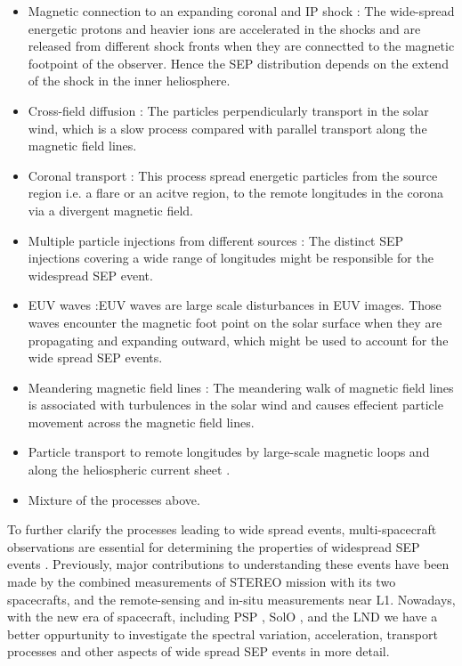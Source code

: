 \begin{itemize}
	\item Magnetic connection to an expanding coronal and IP shock \citep{Cliver1995ICRC, Torsti1999JGR, Reames1999, cane2003two, Richardson2014SoPh, Kouloumvakos2019ApJ}: 
	The wide-spread energetic protons and heavier ions are accelerated in the shocks and are released from different shock fronts when they are connectted to the magnetic footpoint of the observer. Hence the \ac{SEP} distribution depends on the extend of the shock in the inner heliosphere.

	\item Cross-field diffusion \citep{Dresing2012SoPh}: The particles perpendicularly transport in the solar wind, which is a slow process compared with parallel transport along the magnetic field lines.
	
	\item Coronal transport \citep{Reinhard1974SoPh, Newkirk1978JGR}: This process spread energetic particles from the source region i.e. a flare or an acitve region, to the remote longitudes in the corona via a divergent magnetic field. 

	\item Multiple particle injections from different sources \citep{dresing202317}: The distinct \ac{SEP} injections covering a wide range of longitudes might be responsible for the widespread \ac{SEP} event.

	\item \ac{EUV} waves \citep{Rouillard2012ApJ, Park2013ApJ}:\ac{EUV} waves are large scale disturbances in \ac{EUV} images. Those waves encounter the magnetic foot point on the solar surface when they are propagating and expanding outward, which might be used to account for the wide spread \ac{SEP} events.
	\item Meandering magnetic field lines \citep{Laitinen2016AA, Laitinen2023ApJL}: The meandering walk of magnetic field lines is associated with turbulences in the solar wind and causes effecient particle movement across the magnetic field lines.
	\item Particle transport to remote longitudes by large-scale magnetic loops \citep{Klassen2018AA, Schrijver2013ApJ} and along the heliospheric current sheet \citep{Battarbee2018ApJ}.
	\item Mixture of the processes above.
\end{itemize}

To further clarify the processes leading to wide spread events, multi-spacecraft observations are essential for determining the properties of widespread \ac{SEP} events \citep{Kolhoff2021AA}. Previously, major contributions to understanding these events have been made by the combined measurements of \ac{STEREO} mission with its two spacecrafts, and the remote-sensing and in-situ measurements near \ac{L1}. Nowadays, with the new era of spacecraft, including \acl{PSP} \citep{Fox2016SSRv}, \acl{SolO}  \citep{Mueller-2020-SolO}, and the \acl{LND} \citep{Wimmer2020SSRv} we have a better oppurtunity to investigate the spectral variation, acceleration, transport processes and other aspects of wide spread \ac{SEP} events in more detail.

